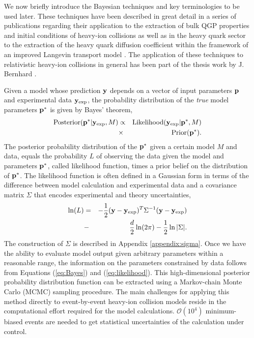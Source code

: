 \documentclass[aps, prc, reprint, amsmath, groupedaddress, nofootinbib]{revtex4-1}
\begin{document}
We now briefly introduce the Bayesian techniques and key terminologies to be used later. These techniques have been described in great detail in a series of publications regarding their application to the extraction of bulk QGP properties and initial conditions of heavy-ion collisions \cite{Bernhard:2015hxa,Bernhard:2016tnd} as well as in the heavy quark sector to the extraction of the heavy quark diffusion coefficient within the framework of an improved Langevin transport model \cite{Xu:2017obm}.
The application of these techniques to relativistic heavy-ion collisions in general has been part of the 
thesis work by J. Bernhard \cite{Bernhard:2018hnz}.

Given a model whose prediction ${\bf y}$ depends on a vector of input parameters ${\bf p}$ and  experimental data ${\bf y}_\textrm{exp}$, 
the probability distribution of the {\it true} model parameters ${\bf p^*}$ is given by Bayes' theorem, 
\begin{eqnarray}\label{eq:Bayes}
\textrm{Posterior}({\bf p^*}|{\bf y}_\textrm{exp}, M) &\propto& \textrm{Likelihood}({\bf y}_\textrm{exp}|{\bf p^*}, M) \nonumber \\ &\times& \textrm{Prior}({\bf p^*}).
\end{eqnarray}
The posterior probability distribution of the ${\bf p^*}$ given a certain model $M$ and data, equals the probability $L$ of observing the data given the model and parameters ${\bf p^*}$, called likelihood function, times a prior belief on the distribution of ${\bf p^*}$.
The likelihood function is often defined in a Gaussian form in terms of the difference between model calculation and experimental data and a covariance matrix $\Sigma$ that encodes experimental and theory uncertainties,
\begin{eqnarray}\label{eq:likelihood}
\ln(L) &=& -\frac{1}{2}({\bf y}-{\bf y}_{\textrm{exp}})^T\Sigma^{-1} ({\bf y}-{\bf y}_{\textrm{exp}})\nonumber\\ 
		&-&\frac{d}{2}\ln(2\pi)-\frac{1}{2}\ln|\Sigma|.
\end{eqnarray}
The construction of $\Sigma$ is described in Appendix \ref{appendix:sigma}.
Once we have the ability to evaluate model output given arbitrary parameters within a reasonable range, the information on the parameters constrained by data follows from Equations (\ref{eq:Bayes}) and (\ref{eq:likelihood}).
This high-dimensional posterior probability distribution function can be extracted using a Markov-chain Monte Carlo (MCMC) sampling procedure.
The main challenges for applying this method directly to event-by-event heavy-ion collision models reside in the computational effort required for the model calculations.  $\mathcal{O}(10^4)$ minimum-biased events are needed to get statistical uncertainties of the calculation under control.
\end{document}

